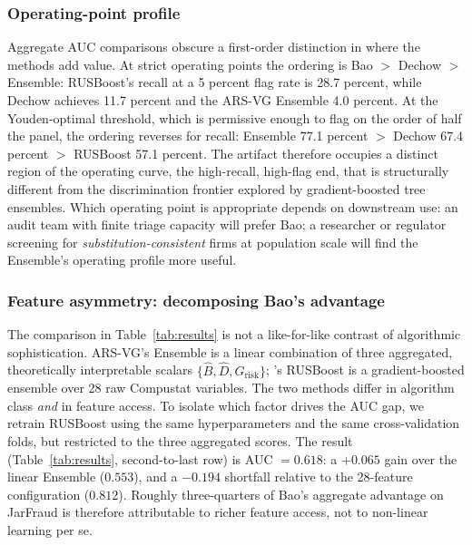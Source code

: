 \documentclass[12pt]{article}
\begin{document}
\subsubsection*{Operating-point profile}
\label{subsec:operating-point}

Aggregate AUC comparisons obscure a first-order distinction in where the
methods add value.  At strict operating points the ordering is Bao
$>$ Dechow $>$ Ensemble: RUSBoost's recall at a 5 percent flag rate is
28.7 percent, while Dechow achieves 11.7 percent and the ARS-VG Ensemble 4.0 percent.
At the Youden-optimal threshold, which is permissive enough to flag on
the order of half the panel, the ordering reverses for recall: Ensemble
77.1 percent $>$ Dechow 67.4 percent $>$ RUSBoost 57.1 percent.  The artifact therefore
occupies a distinct region of the operating curve, the high-recall,
high-flag end, that is structurally different from the discrimination
frontier explored by gradient-boosted tree ensembles.  Which operating
point is appropriate depends on downstream use: an audit team with finite
triage capacity will prefer Bao; a researcher or regulator screening
for \emph{substitution-consistent} firms at population scale will find
the Ensemble's operating profile more useful.

\subsubsection*{Feature asymmetry: decomposing Bao's advantage}
\label{subsec:feature-asymmetry}

The comparison in Table~\ref{tab:results} is not a like-for-like contrast
of algorithmic sophistication.  ARS-VG's Ensemble is a linear combination
of three aggregated, theoretically interpretable scalars
$\{\hat{B}, \hat{D}, G_{\text{risk}}\}$; \citet{bao2020}'s RUSBoost is a gradient-boosted
ensemble over 28 raw Compustat variables.  The two methods differ in
algorithm class \emph{and} in feature access.  To isolate which factor
drives the AUC gap, we retrain RUSBoost using the same hyperparameters
and the same cross-validation folds, but restricted to the three
aggregated scores.  The result (Table~\ref{tab:results}, second-to-last
row) is AUC $=0.618$: a $+0.065$ gain over the linear Ensemble
($0.553$), and a $-0.194$ shortfall relative to the 28-feature
configuration ($0.812$).  Roughly three-quarters of Bao's aggregate
advantage on JarFraud is therefore attributable to richer feature
access, not to non-linear learning per se.
\end{document}
